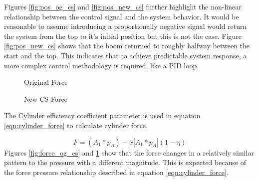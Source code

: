 Figures \ref{fig:pos_og_cs} and \ref{fig:pos_new_cs} further highlight the non-linear relationship between the control signal and the system behavior. It would be reasonable to assume introducing a proportionally negative signal would return the system from the top to it's initial position but this is not the case. Figure \ref{fig:pos_new_cs} shows that the boom returned to roughly halfway between the start and the top. This indicates that to achieve predictable system response, a more complex control methodology is required, like a PID loop.

\begin{figure}[H] \label{ fig-force-mod} 
  \begin{minipage}[b]{0.5\linewidth}
    \caption{Original Force}
    \label{fig:force_og_cs}
  \end{minipage} 
  \begin{minipage}[b]{0.5\linewidth}
    \caption{New CS Force}
    \label{fig:force_new_cs}
  \end{minipage} 
\end{figure}


The Cylinder efficiency coefficient parameter is used in equation \ref{eqn:cylinder_force} to calculate cylinder force.

\begin{equation}
    \label{eqn:cylinder_force}
    F = (A_1 * p_A) - \dot{x}  | A_1 * p_A | (1 - \eta)
\end{equation}
Figures \ref{fig:force_og_cs} and \ref{fig:force_new_cs} show that the force changes in a relatively similar pattern to the pressure with a different magnitude. This is expected because of the force pressure relationship described in equation \ref{eqn:cylinder_force}.

